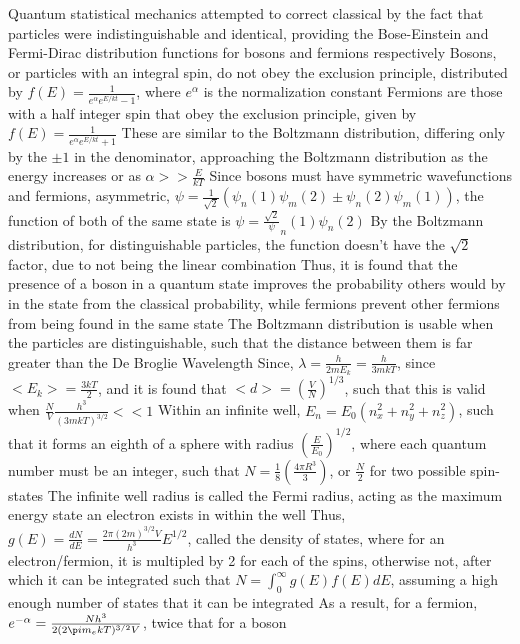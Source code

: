 \documentclass[11 pt, twoside]{article}
\newenvironment{outline*}
{
	\begin{outline}[enumerate]
	}
	{\end{outline}
}
\begin{document}
\begin{outline*}
\1 Quantum statistical mechanics attempted to correct classical by the fact that particles were indistinguishable and identical, providing the Bose-Einstein and Fermi-Dirac distribution functions for bosons and fermions respectively
	\2 Bosons, or particles with an integral spin, do not obey the exclusion principle, distributed by $f(E) = \frac{1}{e^{\alpha}e^{E/kt} - 1}$, where $e^{\alpha}$ is the normalization constant
		\3 Fermions are those with a half integer spin that obey the exclusion principle, given by $f(E) = \frac{1}{e^{\alpha}e^{E/kt} + 1}$
	\2 These are similar to the Boltzmann distribution, differing only by the $\pm 1$ in the denominator, approaching the Boltzmann distribution as the energy increases or as $\alpha >> \frac{E}{kT}$
		\3 Since bosons must have symmetric wavefunctions and fermions, asymmetric, $\psi = \frac{1}{\sqrt{2}}(\psi_n(1)\psi_m(2) \pm \psi_n(2)\psi_m(1))$, the function of both of the same state is $\psi = \frac{\sqrt{2}}\psi_n(1)\psi_n(2)$
		\3 By the Boltzmann distribution, for distinguishable particles, the function doesn't have the $\sqrt{2}$ factor, due to not being the linear combination
		\3 Thus, it is found that the presence of a boson in a quantum state improves the probability others would by in the state from the classical probability, while fermions prevent other fermions from being found in the same state
	\2 The Boltzmann distribution is usable when the particles are distinguishable, such that the distance between them is far greater than the De Broglie Wavelength
		\3 Since, $\lambda = \frac{h}{2mE_k} = \frac{h}{3mkT}$, since $<E_k> = \frac{3kT}{2}$, and it is found that $<d> = (\frac{V}{N})^{1/3}$, such that this is valid when $\frac{N}{V}\frac{h^3}{(3mkT)^{3/2}} << 1$
		\3 Within an infinite well, $E_n = E_0(n_x^2 + n_y^2 + n_z^2)$, such that it forms an eighth of a sphere with radius $(\frac{E}{E_0})^{1/2}$, where each quantum number must be an integer, such that $N = \frac{1}{8}(\frac{4\pi R^3}{3})$, or $\frac{N}{2}$ for two possible spin-states
			\4 The infinite well radius is called the Fermi radius, acting as the maximum energy state an electron exists in within the well
			\4 Thus, $g(E) = \frac{dN}{dE} = \frac{2\pi(2m)^{3/2}V}{h^3}E^{1/2}$, called the density of states, where for an electron/fermion, it is multipled by 2 for each of the spins, otherwise not, after which it can be integrated such that $N = \int^{\infty}_0 g(E)f(E)dE$, assuming a high enough number of states that it can be integrated
			\4 As a result, for a fermion, $e^{-\alpha} = \frac{Nh^3}{2(2\p im_ekT)^{3/2}V}$, twice that for a boson

\end{outline*}
\end{document}
